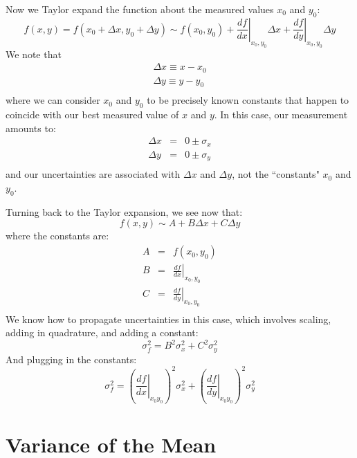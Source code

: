 \documentclass[12pt]{article}
\begin{document}
Now we Taylor expand the function about the measured values $x_0$ and $y_0$:
\begin{equation*}
f(x,y) = f(x_0+\Delta x,y_0 + \Delta y) \sim f(x_0,y_0) + \left.\frac{df}{dx}\right|_{x_0,y_0} \Delta x + \left.\frac{df}{dy}\right|_{x_0,y_0} \Delta y 
\end{equation*}
We note that 
\begin{eqnarray*}
\Delta x \equiv x - x_0 \\
\Delta y \equiv y - y_0 \\
\end{eqnarray*}
where we can consider $x_0$ and $y_0$ to be precisely known constants that happen to coincide with our best measured value of $x$ and $y$.  In this case, our measurement amounts to:
\begin{eqnarray*}
\Delta x &=& 0 \pm \sigma_x\\
\Delta y &=& 0 \pm \sigma_y\\
\end{eqnarray*}
and our uncertainties are associated with $\Delta x$ and $\Delta y$, not the ``constants" $x_0$ and $y_0$.

Turning back to the Taylor expansion, we see now that:
\begin{equation*}
f(x,y) \sim A + B \Delta x + C \Delta y 
\end{equation*}
where the constants are:
\begin{eqnarray*}
A  &=& f(x_0,y_0)\\
B  &=& \left.\frac{df}{dx}\right|_{x_0,y_0}\\
C  &=& \left.\frac{df}{dy}\right|_{x_0,y_0}\\
\end{eqnarray*}
We know how to propagate uncertainties in this case, which involves scaling, adding in quadrature, and adding a constant:
\begin{equation*}
\sigma_f^2 =   B^2 \sigma_x^2 + C^2 \sigma_y^2 
\end{equation*}
And plugging in the constants:
\begin{equation*}
\sigma^2_f = \left(\left.\frac{df}{dx}\right|_{x_0 y_0} \right)^2 \sigma^2_x  + \left( \left.\frac{df}{dy} \right|_{x_0 y_0} \right)^2 \sigma^2_y
\end{equation*}   

\section{Variance of the Mean}
\end{document}
